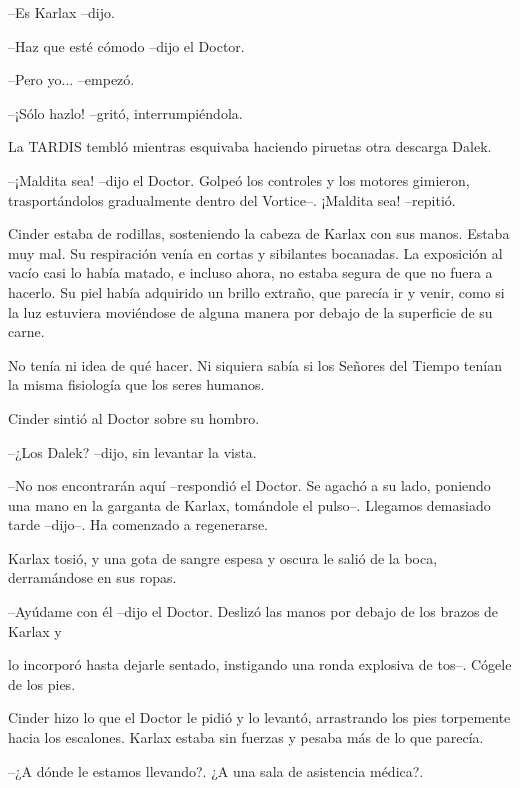 --Es Karlax --dijo.

--Haz que esté cómodo --dijo el Doctor.

--Pero yo... --empezó.

--¡Sólo hazlo! --gritó, interrumpiéndola.



La TARDIS tembló mientras esquivaba haciendo piruetas otra descarga Dalek. 



--¡Maldita sea! --dijo el Doctor. Golpeó los controles y los motores gimieron, trasportándolos gradualmente dentro del Vortice--. ¡Maldita sea! --repitió.



Cinder estaba de rodillas, sosteniendo la cabeza de Karlax con sus manos. Estaba muy mal. Su respiración venía en cortas y sibilantes bocanadas. La exposición al vacío casi lo había matado, e incluso ahora, no estaba segura de que no fuera a hacerlo. Su piel había adquirido un brillo extraño, que parecía ir y venir, como si la luz estuviera moviéndose de alguna manera por debajo de la superficie de su carne.

No tenía ni idea de qué hacer. Ni siquiera sabía si los Señores del Tiempo tenían la misma fisiología que los seres humanos.

Cinder sintió al Doctor sobre su hombro. 



--¿Los Dalek? --dijo, sin levantar la vista.

--No nos encontrarán aquí --respondió el Doctor. Se agachó a su lado, poniendo una mano en la garganta de Karlax, tomándole el pulso--. Llegamos demasiado tarde --dijo--. Ha comenzado a regenerarse.



Karlax tosió, y una gota de sangre espesa y oscura le salió de la boca, derramándose en sus ropas.



--Ayúdame con él --dijo el Doctor. Deslizó las manos por debajo de los brazos de Karlax y 

lo incorporó hasta dejarle sentado, instigando una ronda explosiva de tos--. Cógele de los pies.



Cinder hizo lo que el Doctor le pidió y lo levantó, arrastrando los pies torpemente hacia los escalones. Karlax estaba sin fuerzas y pesaba más de lo que parecía. 



--¿A dónde le estamos llevando?. ¿A una sala de asistencia médica?.

